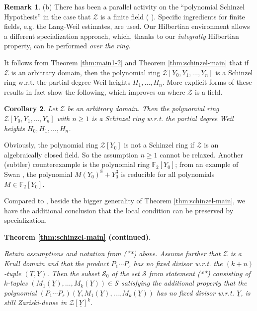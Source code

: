 \documentclass[11pt,a4paper,reqno]{amsart}
\newtheorem{thm}{Theorem}[section]
\newtheorem{cor}[thm]{Corollary}
\theoremstyle{definition}
\newtheorem{rmk}[thm]{Remark}
\begin{document}
{\begin{rmk}
\noindent
(b) There has been a parallel activity on the ``polynomial Schinzel Hypothesis'' in the case that ${\mathcal Z}$ is a finite field (\cite{BenWi2005} \cite{Pol2008} \cite{BS2012} \cite{BSJa2012} \cite{Entin2016}). Specific ingredients for finite fields, \hbox{e.g.} the Lang-Weil estimates, are used. Our Hilbertian environment allows a different specialization approach, which, thanks to our \emph{integrally} Hilbertian property, can be performed \emph{over the ring}.
\end{rmk}

It follows from Theorem \ref{thm:main1-2} and Theorem \ref{thm:schinzel-main} that if ${\mathcal Z}$ is an arbitrary domain, then the polynomial ring ${\mathcal Z}[Y_0,Y_1,\ldots,Y_n]$ is a Schinzel ring \hbox{w.r.t.} the partial degree Weil heights $H_1,\ldots,H_n$. More explicit forms of these results in fact show the following, which improves on \cite[Theorem 1.2]{BDN20b} where  ${\mathcal Z}$ is a field.

\begin{cor} \label{cor:Z[Y_0,...,Y_n]}
Let ${\mathcal Z}$ be an arbitrary domain. Then the polynomial ring ${\mathcal Z}[Y_0, Y_1,\ldots,Y_n]$ with $n\geq 1$ is a Schinzel ring \hbox{w.r.t.} the partial degree Weil heights $H_0, H_1,\ldots,H_n$. 
\end{cor}

Obviously, the polynomial ring ${\mathcal Z}[Y_0]$ is not a Schinzel ring if ${\mathcal Z}$ is an algebraically closed field. So the assumption $n\geq 1$ cannot be relaxed.  Another (subtler) counterexample is the polynomial ring ${\mathbb F}_2[Y_0]$; from an example of Swan \cite[pp. 1102-1103]{swan62}, the polynomial $M(Y_0)^8+Y_0^3$ is reducible for all polynomials $M\in {\mathbb F}_2[Y_0]$. 
\vskip 1mm



Compared to \cite{BDN20b}, beside the bigger generality of Theorem \ref{thm:schinzel-main}, 
we have the additional conclusion that the local condition can be preserved by specialization. 
\vskip 1mm




\noindent
{\bf Theorem \ref{thm:schinzel-main} (continued).}} \emph{Retain assumptions and notation from {\rm (**)} above. Assume further that $\mathcal{Z}$ is 
a Krull domain and that the product $P_1\cdots P_s$ has no fixed divisor \hbox{w.r.t.} the $(k+n)$-tuple $(\underline T,\underline{Y})$. 
Then the subset ${\mathcal S}_0$ of the set ${\mathcal S}$ from statement \hbox{\rm (**)} consisting of $k$-tuples $(M_1(\underline Y),\ldots,M_k(\underline Y)) \in {\mathcal S}$ satisfying the additional property that the polynomial $(P_1\cdots P_s)(\underline Y, M_1(\underline Y),\ldots,M_k(\underline Y))$ has no fixed divisor \hbox{w.r.t.} $\underline Y$,  is still Zariski-dense in ${\mathcal Z}[\underline Y]^k$.}
\end{document}
